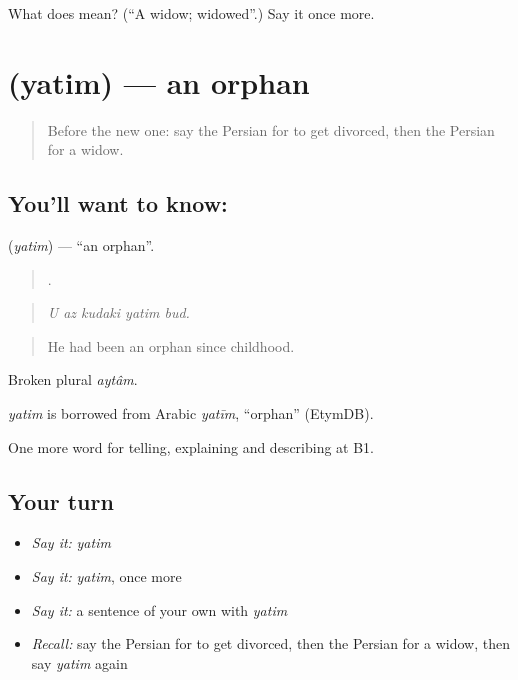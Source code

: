 \begin{tcolorbox}[breakable,colback=teal!4,colframe=teal!35!black,title={Before you move on}]
What does  mean? (\textquotedblleft{}A widow; widowed\textquotedblright{}.) Say it once more.
\end{tcolorbox}
\section[\texorpdfstring{\fa{یتیم} (yatim)}{یتیم (yatim)}]{ (yatim) — an orphan}

\label{lesson:FA-C336-yatim}



\begin{quote}
Before the new one: say the Persian for to get divorced, then the Persian for a widow.
\end{quote}

\subsection*{You'll want to know: }
\textbf{} (\emph{yatim}) — \textquotedblleft{}an orphan\textquotedblright{}.

\begin{quote}
    .
\end{quote}

\begin{quote}
\emph{U az kudaki yatim bud.}
\end{quote}

\begin{quote}
He had been an orphan since childhood.
\end{quote}

Broken plural \emph{aytâm}.

\begin{cousinweb}
\emph{yatim} is borrowed from Arabic \emph{yatīm}, \textquotedblleft{}orphan\textquotedblright{} (EtymDB).
\end{cousinweb}

\begin{grammarlens}[title={What you've built}]
One more word for telling, explaining and describing at B1.
\end{grammarlens}

\subsection*{Your turn}
\begin{itemize}
\raggedright
  \item \emph{Say it:} \emph{yatim}
  \item \emph{Say it:} \emph{yatim}, once more
  \item \emph{Say it:} a sentence of your own with \emph{yatim}
  \item \emph{Recall:} say the Persian for to get divorced, then the Persian for a widow, then say \emph{yatim} again
\end{itemize}

